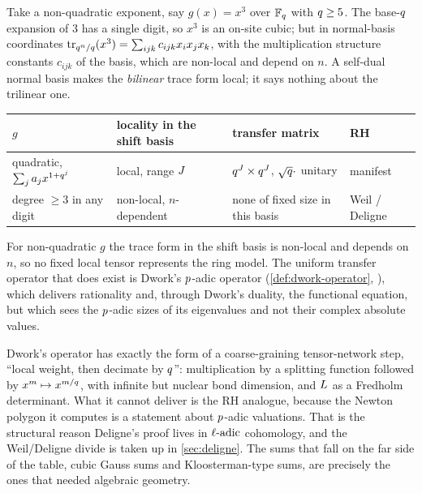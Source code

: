 Take a non-quadratic exponent, say $g(x) = x^{3}$ over $\mathbb F_q$ with
$q\ge5$. The base-$q$ expansion of $3$ has a single digit, so $x^{3}$ is
an on-site cubic; but in normal-basis coordinates $\operatorname{tr}_{q^n/q}(x^{3}) =
\sum_{ijk}c_{ijk}x_ix_jx_k$, with the multiplication structure constants
$c_{ijk}$ of the basis, which are non-local and depend on $n$. A self-dual
normal basis makes the \emph{bilinear} trace form local; it says nothing about
the trilinear one.

\begin{center}
\small
\begin{tabular}{lll l}
\toprule
$g$ & locality in the shift basis & transfer matrix & RH \\
\midrule
quadratic, $\sum_j a_jx^{1+q^{j}}$ & local, range $J$
  & $q^{J}\times q^{J}$, $\sqrt{q}\cdot$ unitary
  & manifest \\
degree $\ge3$ in any digit & non-local, $n$-dependent
  & none of fixed size in this basis & Weil / Deligne \\
\bottomrule
\end{tabular}
\end{center}

\begin{observation}
\label{obs:as-nonquadratic}
For non-quadratic $g$ the trace form in the shift basis is non-local and
depends on $n$, so no fixed local tensor represents the ring model. The
uniform transfer operator that does exist is Dwork's $p$-adic operator
(\cref{def:dwork-operator}, \cite{dwork1960rationality}), which delivers
rationality and, through Dwork's duality, the functional equation, but which
sees the $p$-adic sizes of its eigenvalues and not their complex absolute
values.
\end{observation}

Dwork's operator has exactly the form of a coarse-graining tensor-network
step, ``local weight, then decimate by $q$'': multiplication by a splitting
function followed by $x^{m}\mapsto x^{m/q}$, with infinite but nuclear bond
dimension, and $L$ as a Fredholm determinant. What it cannot deliver is
the RH analogue, because the Newton polygon it computes is a statement about
$p$-adic valuations. That is the structural reason Deligne's proof
\cite{deligne1974weil} lives in $\ell\text{-adic}$ cohomology, and the Weil/Deligne
divide is taken up in \cref{sec:deligne}. The sums that fall on the far side
of the table, cubic Gauss sums and Kloosterman-type sums, are precisely the
ones that needed algebraic geometry.

